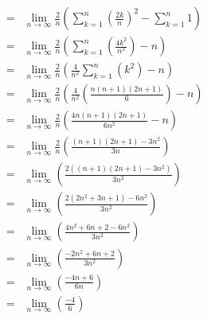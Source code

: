 \documentclass{article}
\begin{document}
\begin{enumerate}
\begin{eqnarray}
                                                                                                         &=& \lim_{n \to \infty}{\frac{2}{n}\left(\sum_{k = 1}^n{\left(\frac{2k}{n}\right)^2} - \sum_{k = 1}^n{1}\right)} \\
                                                                                                         &=& \lim_{n \to \infty}{\frac{2}{n}\left(\sum_{k = 1}^n{\left(\frac{4k^2}{n^2}\right)} - n\right)} \\
                                                                                                         &=& \lim_{n \to \infty}{\frac{2}{n}\left(\frac{4}{n^2}\sum_{k = 1}^n{\left(k^2\right)} - n\right)} \\
                                                                                                         &=& \lim_{n \to \infty}{\frac{2}{n}\left(\frac{4}{n^2}\left(\frac{n(n+1)(2n+1)}{6}\right) - n\right)} \\
                                                                                                         &=& \lim_{n \to \infty}{\frac{2}{n}\left(\frac{4n(n+1)(2n+1)}{6n^2} - n\right)} \\
                                                                                                         &=& \lim_{n \to \infty}{\frac{2}{n}\left(\frac{(n+1)(2n+1) - 3n^2}{3n}\right)} \\
                                                                                                         &=& \lim_{n \to \infty}{\left(\frac{2\left((n+1)(2n+1) - 3n^2\right)}{3n^2}\right)} \\
                                                                                                         &=& \lim_{n \to \infty}{\left(\frac{2\left(2n^2 + 3n + 1\right) - 6n^2}{3n^2}\right)} \\
                                                                                                         &=& \lim_{n \to \infty}{\left(\frac{4n^2 + 6n + 2 - 6n^2}{3n^2}\right)} \\
                                                                                                         &=& \lim_{n \to \infty}{\left(\frac{-2n^2 + 6n + 2}{3n^2}\right)} \\
                                                                                                         &=& \lim_{n \to \infty}{\left(\frac{-4n + 6}{6n}\right)} \\
                                                                                                         &=& \lim_{n \to \infty}{\left(\frac{-4}{6}\right)} \\

\end{eqnarray}
\end{enumerate}
\end{document}

